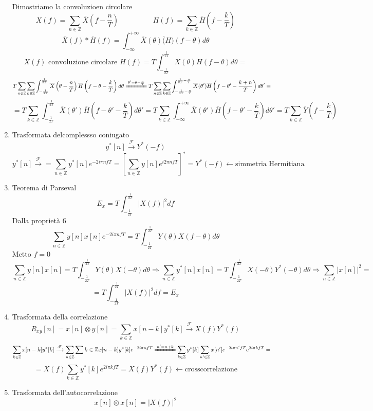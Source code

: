\documentclass{article}
\newcommand{\trasformata}{\xrightarrow{\mathscr{F}}}
\begin{document}
\begin{enumerate}
        Dimostriamo la convoluzioen circolare
        \[X(f)=\sum_{n\in\mathbb{Z}}\overline{X}\left(f-\frac{n}{T}\right)\hspace{2cm}H(f)=\sum_{k\in\mathbb{Z}}\overline{H}\left(f-\frac{k}{T}\right)\]
        \[\overline{X}(f)*\overline{H}(f)=\int_{-\infty}^{+\infty}\overline{X}(\theta)\overline(H)(f-\theta)d\theta\]
        \[X(f)\text{ convoluzione circolare }H(f)=T\int_{-\frac{1}{2T}}^{\frac{1}{2T}}X(\theta)H(f-\theta)d\theta=\]
        \[T\sum_{n\in\mathbb{Z}}\sum_{k\in\mathbb{Z}}\int_{-\frac{1}{2T}}^{\frac{1}{2T}}\overline{X}\left(\theta-\frac{n}{T}\right)\overline{H}\left(f-\theta-\frac{k}{T}\right)d\theta\xlongequal{\theta'=\theta-\frac{n}{T}}T\sum_{n\in\mathbb{Z}}\sum_{k\in\mathbb{Z}}\int_{-\frac{1}{2T}-\frac{n}{T}}^{\frac{1}{2T}-\frac{n}{T}}\overline{X}(\theta')\overline{H}\left(f-\theta'-\frac{k+n}{T}\right)d\theta'=\]
        \[=T\sum_{k\in\mathbb{Z}}\int_{-\frac{1}{2T}}^\frac{1}{2T}\overline{X}(\theta')\overline{H}\left(f-\theta'-\frac{k}{T}\right)d\theta'=T\sum_{k\in\mathbb{Z}}\int_{-\infty}^{+\infty}\overline{X}(\theta')\overline{H}\left(f-\theta'-\frac{k}{T}\right)d\theta'=T\sum_{k\in\mathbb{Z}}\overline{Y}\left(f-\frac{k}{T}\right)\]
    \item Trasformata delcomplessso coniugato
        \[y^*[n]\trasformata Y^*(-f)\]
        \[y^*[n]\trasformata=\sum_{n\in\mathbb{Z}}y^*[n]e^{-2i\pi nfT}={\left[\sum_{n\in\mathbb{Z}}y[n]e^{i2\pi nfT}\right]}^*=Y^*(-f)\leftarrow\text{simmetria Hermitiana}\]
    \item Teorema di Parseval
        \[E_x=T\int_{-\frac{1}{2T}}^\frac{1}{2T}|X(f)|^2df\]
        Dalla proprietà 6
        \[\sum_{n\in\mathbb{Z}}y[n]x[n]e^{-2i\pi nfT}=T\int_{-\frac{1}{2T}}^\frac{1}{2T}Y(\theta)X(f-\theta)d\theta\]
        Metto \(f=0\)
        \[\sum_{n\in\mathbb{Z}}y[n]x[n]=T\int_{-\frac{1}{2T}}^\frac{1}{2T}Y(\theta)X(-\theta)d\theta\Rightarrow\sum_{n\in\mathbb{Z}}y^*[n]x[n]=T\int_{-\frac{1}{2T}}^{\frac{1}{2T}}X(-\theta)Y^*(-\theta)d\theta\Rightarrow\sum_{n\in\mathbb{Z}}|x[n]|^2=\]
        \[=T\int_{-\frac{1}{2T}}^\frac{1}{2T}|X(f)|^2df=E_x\]
    \item Trasformata della correlazione
        \[R_{xy}[n]=x[n]\otimes y[n]=\sum_{k\in\mathbb{Z}}x[n-k]y^*[k]\trasformata X(f)Y^*(f)\]
        \[\sum_{k\in\mathbb{Z}}x[n-k]y^*[k]\trasformata\sum_{n\in\mathbb{Z}}\sum{k\in\mathbb{Z}}x[n-k]y^*[k]e^{-2i\pi nfT}\xlongequal{n'=n+k}\sum_{k\in\mathbb{Z}}y^*[k]\sum_{n'\in\mathbb{Z}}x[n']e^{-2i\pi n' fT}e^{2i\pi kfT}=\]
        \[=X(f)\sum_{k\in\mathbb{Z}}y^*[k]e^{2i\pi kfT}=X(f)Y^*(f)\leftarrow\text{crosscorrelazione}\]
    \item Trasformata dell'autocorrelazione
        \[x[n]\otimes x[n]=|X(f)|^2\]
\end{enumerate}
\end{document}
